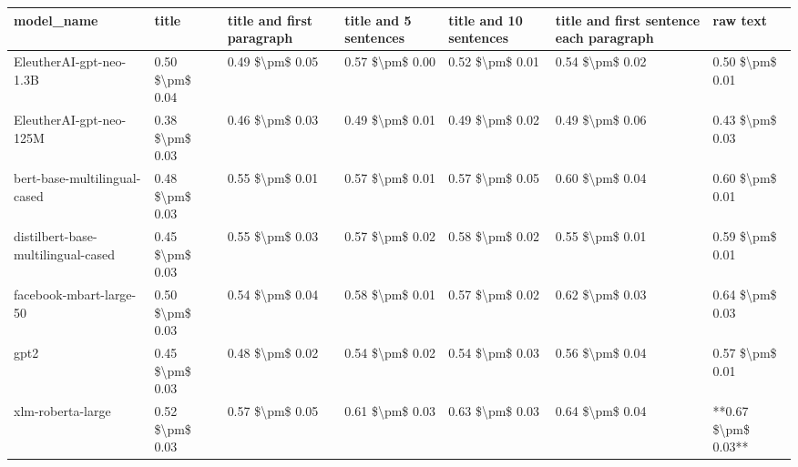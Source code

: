 \begin{tabular}{lllllll}
\toprule
                        model\_name &           title & title and first paragraph & title and 5 sentences & title and 10 sentences & title and first sentence each paragraph &            raw text \\
\midrule
           EleutherAI-gpt-neo-1.3B & 0.50 \$\textbackslash pm\$ 0.04 &           0.49 \$\textbackslash pm\$ 0.05 &       0.57 \$\textbackslash pm\$ 0.00 &        0.52 \$\textbackslash pm\$ 0.01 &                         0.54 \$\textbackslash pm\$ 0.02 &     0.50 \$\textbackslash pm\$ 0.01 \\
           EleutherAI-gpt-neo-125M & 0.38 \$\textbackslash pm\$ 0.03 &           0.46 \$\textbackslash pm\$ 0.03 &       0.49 \$\textbackslash pm\$ 0.01 &        0.49 \$\textbackslash pm\$ 0.02 &                         0.49 \$\textbackslash pm\$ 0.06 &     0.43 \$\textbackslash pm\$ 0.03 \\
      bert-base-multilingual-cased & 0.48 \$\textbackslash pm\$ 0.03 &           0.55 \$\textbackslash pm\$ 0.01 &       0.57 \$\textbackslash pm\$ 0.01 &        0.57 \$\textbackslash pm\$ 0.05 &                         0.60 \$\textbackslash pm\$ 0.04 &     0.60 \$\textbackslash pm\$ 0.01 \\
distilbert-base-multilingual-cased & 0.45 \$\textbackslash pm\$ 0.03 &           0.55 \$\textbackslash pm\$ 0.03 &       0.57 \$\textbackslash pm\$ 0.02 &        0.58 \$\textbackslash pm\$ 0.02 &                         0.55 \$\textbackslash pm\$ 0.01 &     0.59 \$\textbackslash pm\$ 0.01 \\
           facebook-mbart-large-50 & 0.50 \$\textbackslash pm\$ 0.03 &           0.54 \$\textbackslash pm\$ 0.04 &       0.58 \$\textbackslash pm\$ 0.01 &        0.57 \$\textbackslash pm\$ 0.02 &                         0.62 \$\textbackslash pm\$ 0.03 &     0.64 \$\textbackslash pm\$ 0.03 \\
                              gpt2 & 0.45 \$\textbackslash pm\$ 0.03 &           0.48 \$\textbackslash pm\$ 0.02 &       0.54 \$\textbackslash pm\$ 0.02 &        0.54 \$\textbackslash pm\$ 0.03 &                         0.56 \$\textbackslash pm\$ 0.04 &     0.57 \$\textbackslash pm\$ 0.01 \\
                 xlm-roberta-large & 0.52 \$\textbackslash pm\$ 0.03 &           0.57 \$\textbackslash pm\$ 0.05 &       0.61 \$\textbackslash pm\$ 0.03 &        0.63 \$\textbackslash pm\$ 0.03 &                         0.64 \$\textbackslash pm\$ 0.04 & **0.67 \$\textbackslash pm\$ 0.03** \\
\bottomrule
\end{tabular}
